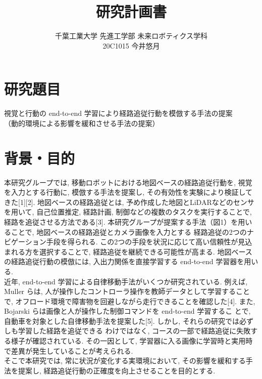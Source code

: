 \documentclass{jsarticle}
\begin{document}
\title{{\vspace*{-30mm}}{\huge 研究計画書}}
\author{\large 千葉工業大学 先進工学部 未来ロボティクス学科 \vspace*{2mm}\\20C1015 今井悠月}
\date{}
\maketitle




\section{研究題目}
視覚と行動の end-to-end 学習により経路追従行動を模倣する手法の提案\\
\hspace{6.25zw}（動的環境による影響を緩和させる手法の提案）

\section{背景・目的}
本研究グループでは, 移動ロボットにおける地図ベースの経路追従行動を, 視覚を入力とする行動に, 模倣する手法を提案し, 
その有効性を実験により検証してきた[1][2]. 地図ベースの経路追従とは, 予め作成した地図とLiDARなどのセンサを用いて, 
自己位置推定, 経路計画, 制御などの複数のタスクを実行することで, 経路を追従させる方法である[3]. 
本研究グループが提案する手法（図1）を用いることで, 地図ベースの経路追従とカメラ画像を入力とする
経路追従の2つのナビゲーション手段を得られる. 
この2つの手段を状況に応じて高い信頼性が見込まれる方を選択することで, 経路追従を継続できる可能性が高まる.
地図ベースの経路追従行動の模倣には, 入出力関係を直接学習する end-to-end 学習器を用いる.\\\hspace{1zw}
近年, end-to-end 学習による自律移動手法がいくつか研究されている.
例えば, Muller らは, 人が操作したコントローラ操作を教師データとして学習することで, 
オフロード環境で障害物を回避しながら走行できることを確認した[4].
また, Bojarski らは画像と人が操作した制御コマンドを end-to-end 学習するこ
とで, 自動車を対象とした自律移動手法を提案した[5].
しかし, それらの研究では必ずしも学習した経路を追従できる
わけではなく, コースの一部で経路追従に失敗する様子が確認されている. 
その一因として, 学習器に入る画像に学習時と実用時で差異が発生していることが考えられる.\\\hspace{1zw}
そこで本研究では, 常に状況が変化する実環境において, その影響を緩和する手法を提案し, 
経路追従行動の正確度を向上させることを目的とする.
\vspace*{4mm}
\end{document}
